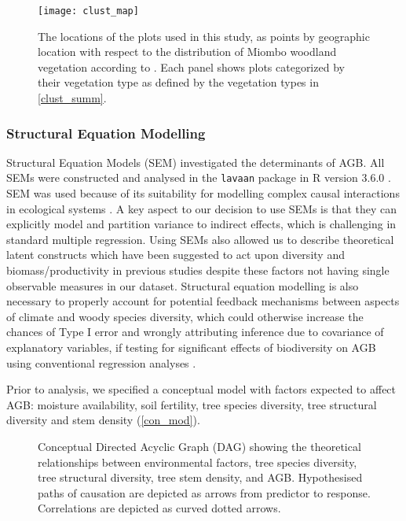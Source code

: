 \documentclass[11pt,a4paper]{article}
\begin{document}
\begin{landscape}



\begin{figure}[H]
\centering
	\texttt{[image: clust\_map]}
	\caption{The locations of the \nplots{} plots used in this study, as points by geographic location with respect to the distribution of Miombo woodland vegetation according to \citet{White1987}. Each panel shows plots categorized by their vegetation type as defined by the vegetation types in \autoref{clust_summ}.}
	\label{clust_map}
\end{figure}
\end{landscape}

\subsubsection{Structural Equation Modelling}

Structural Equation Models (SEM) investigated the determinants of AGB. All SEMs were constructed and analysed in the \verb|lavaan| package \citep{lavaan} in R version 3.6.0 \citep{R2019}. SEM was used because of its suitability for modelling complex causal interactions in ecological systems \citep{Lee2007}. A key aspect to our decision to use SEMs is that they can explicitly model and partition variance to indirect effects, which is challenging in standard multiple regression. Using SEMs also allowed us to describe theoretical latent constructs which have been suggested to act upon diversity and biomass/productivity in previous studies despite these factors not having single observable measures in our dataset. Structural equation modelling is also necessary to properly account for potential feedback mechanisms between aspects of climate and woody species diversity, which could otherwise increase the chances of Type I error and wrongly attributing inference due to covariance of explanatory variables, if testing for significant effects of biodiversity on AGB using conventional regression analyses \citep{Nachtigall2003}.

Prior to analysis, we specified a conceptual model with factors expected to affect AGB: moisture availability, soil fertility, tree species diversity, tree structural diversity and stem density (\autoref{con_mod}). 

\begin{figure}[H]
\centering
	
	\caption{Conceptual Directed Acyclic Graph (DAG) showing the theoretical relationships between environmental factors, tree species diversity, tree structural diversity, tree stem density, and AGB. Hypothesised paths of causation are depicted as arrows from predictor to response. Correlations are depicted as curved dotted arrows.}
	\label{con_mod}
\end{figure}
\end{document}
